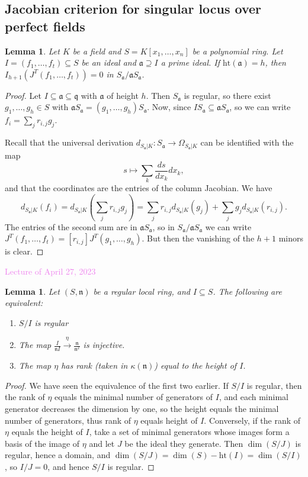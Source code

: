 \documentclass{amsart}[12pt]
\newcommand{\htt}{\mathrm{ht}}
\newcommand{\Apr}[1]{\textcolor{violet}{Lecture of April #1, 2023}}
\newcommand{\fa}{{\mathfrak a}}
\newcommand{\fn}{{\mathfrak n}}
\newcommand{\fq}{{\mathfrak q}}
\numberwithin{equation}{section}
\theoremstyle{plain} %
\newtheorem{lem}[equation]{Lemma}
\theoremstyle{definition}
\theoremstyle{remark}
\newcommand{\xra}[1]{\xrightarrow{#1}}
\begin{document}
\subsection{Jacobian criterion for singular locus over perfect fields}


\begin{lem} Let $K$ be a field and $S=K[x_1,\dots,x_n]$ be a polynomial ring. Let $I=(f_1,\dots,f_t) \subseteq S$ be an ideal and $\fa \supseteq I$ a prime ideal. If $\htt(\fa) = h$, then $I_{h+1}(J^T(f_1,\dots,f_t)) = 0$ in $S_{\fa}/\fa S_{\fa}$.
\end{lem}
\begin{proof} Let $I \subseteq \fa\subseteq \fq$ with $\fa$ of height $h$. Then $S_\fa$ is regular, so there exist $g_1,\dots,g_h\in S$ with $\fa S_\fa = (g_1,\dots,g_h) S_\fa$. Now,  since $I S_{\fa} \subseteq \fa S_{\fa}$, so we can write $f_i = \sum_j r_{i,j} g_j$.

Recall that the universal derivation $d_{S_{\fa}|K}: S_{\fa} \to \Omega_{S_{\fa}|K}$ can be identified with the map 
\[ s \mapsto \sum_{k} \frac{ds}{dx_k} dx_k,\]
and that the coordinates are the entries of the column Jacobian.
We have 
\[ d_{S_{\fa}|K}(f_i) = d_{S_{\fa}|K}(\sum_j r_{i,j} g_j) = \sum_j  r_{i,j} d_{S_{\fa}|K}( g_j) + \sum_j  g_j d_{S_{\fa}|K}(r_{i,j} ).\]
The entries of the second sum are in $\fa S_{\fa}$, so in $S_{\fa}/\fa S_{\fa}$ we can write $J^T(f_1,\dots,f_t) = [r_{i,j}] J^T(g_1,\dots,g_h)$. But then the vanishing of the $h+1$ minors is clear.
\end{proof}


\Apr{27}

\begin{lem} Let $(S,\fn)$ be a regular local ring, and $I\subseteq S$.
The following are equivalent:
\begin{enumerate}
\item $S/I$ is regular
\item The map $\frac{I}{\fn I} \xra{\eta} \frac{\fn}{\fn^2}$ is injective.
\item The map $\eta$ has rank (taken in $\kappa(\fn)$) equal to the height of $I$.
\end{enumerate}
\end{lem}
\begin{proof}
We have seen the equivalence of the first two earlier. If $S/I$ is regular, then the rank of $\eta$ equals the minimal number of generators of $I$, and each minimal generator decreases the dimension by one, so the height equals the minimal number of generators, thus rank of $\eta$ equals height of $I$.  Conversely, if the rank of $\eta$ equals the height of $I$, take a set of minimal generators whose images form a basis of the image of $\eta$ and let $J$ be the ideal they generate. Then $\dim(S/J)$ is regular, hence a domain, and $\dim(S/J)=\dim(S) - \htt(I) = \dim(S/I)$, so $I/J=0$, and hence $S/I$ is regular.
\end{proof}
\end{document}
